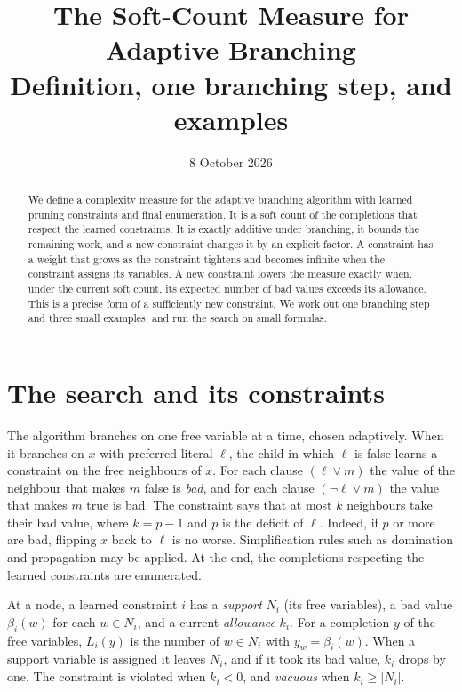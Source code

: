 \documentclass[11pt,a4paper]{article}
\title{The Soft-Count Measure for Adaptive Branching\\
\large Definition, one branching step, and examples}
\author{}
\date{8 October 2026}
\theoremstyle{definition}
\begin{document}
\maketitle

\begin{abstract}
We define a complexity measure for the adaptive branching algorithm with
learned pruning constraints and final enumeration. It is a soft count of the
completions that respect the learned constraints. It is exactly additive under
branching, it bounds the remaining work, and a new constraint changes it by an
explicit factor. A constraint has a weight that grows as the constraint
tightens and becomes infinite when the constraint assigns its variables. A new
constraint lowers the measure exactly when, under the current soft count, its
expected number of bad values exceeds its allowance. This is a precise form of
a sufficiently new constraint. We work out one branching step and three small
examples, and run the search on small formulas.
\end{abstract}

\section{The search and its constraints}

The algorithm branches on one free variable at a time, chosen adaptively. When
it branches on $x$ with preferred literal $\ell$, the child in which $\ell$ is
false learns a constraint on the free neighbours of $x$. For each clause
$(\ell\lor m)$ the value of the neighbour that makes $m$ false is \emph{bad},
and for each clause $(\neg\ell\lor m)$ the value that makes $m$ true is bad.
The constraint says that at most $k$ neighbours take their bad value, where
$k=p-1$ and $p$ is the deficit of $\ell$. Indeed, if $p$ or more are bad,
flipping $x$ back to $\ell$ is no worse. Simplification rules such as
domination and propagation may be applied. At the end, the completions
respecting the learned constraints are enumerated.

At a node, a learned constraint $i$ has a \emph{support} $N_i$ (its free
variables), a bad value $\beta_i(w)$ for each $w\in N_i$, and a current
\emph{allowance} $k_i$. For a completion $y$ of the free variables, $L_i(y)$ is
the number of $w\in N_i$ with $y_w=\beta_i(w)$. When a support variable is
assigned it leaves $N_i$, and if it took its bad value, $k_i$ drops by one.
The constraint is violated when $k_i<0$, and \emph{vacuous} when
$k_i\ge|N_i|$.
\end{document}
